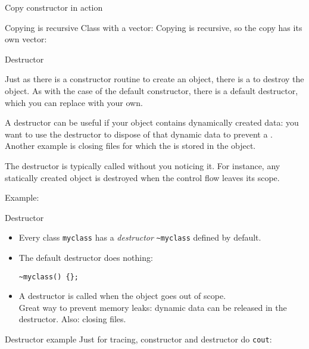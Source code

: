 \begin{slide}{Copy constructor in action}
  \label{sl:class-copy-out}
\end{slide}

\begin{block}{Copying is recursive}
  \label{sl:class-copy-vector}
  Class with a vector:
  Copying is recursive, so the copy has its own vector:
\end{block}

 {Destructor}
\label{sec:destructor}

Just as there is a constructor routine to create an object, there is a
 to destroy the object.
As with the case of the default constructor, there is a default
destructor, which you can replace with your own.

A destructor can be useful if your object contains dynamically created
data: you want to use the destructor to dispose of that dynamic data
to prevent a . Another example is closing
files for which the  is stored in the object.

The destructor is typically called without you noticing it. For
instance, any statically created object is destroyed when the control
flow leaves its scope.

Example:
%

\begin{slide}{Destructor}
  \label{sl:class-destruct}
  \begin{itemize}
  \item Every class \lstinline{myclass} has a \emph{destructor} \lstinline{~myclass}
    defined by default.
  \item The default destructor does nothing:
\begin{lstlisting}
~myclass() {};
\end{lstlisting}
\item A destructor is called when the object goes out of scope.\\
  Great way to prevent memory leaks: dynamic data can be released
  in the destructor. Also: closing files.
\end{itemize}
\end{slide}

\begin{slide}{Destructor example}
  \label{sl:class-destruct-ex1}
  Just for tracing, constructor and destructor do \lstinline{cout}:
\end{slide}

